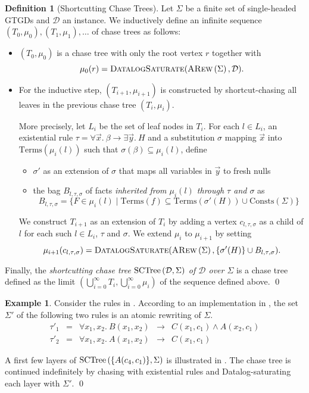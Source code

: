 \documentclass[12pt]{report}
\theoremstyle{plain}
\theoremstyle{definition}
\newtheorem{definition}[theorem]{Definition}
\newtheorem{example}[theorem]{Example}
\def\Consts{{\mathrm{Consts}}}
\def\Terms{{\mathrm{Terms}}}
\newcommand{\ARew}[1]{\ensuremath{\normalfont{\textsc{ARew}} \left( #1 \right)}}
\newcommand{\SCTree}[2]{\ensuremath{\normalfont{\textrm{SCTree}} \left( #1, #2 \right)}}
\begin{document}
\begin{definition}[Shortcutting Chase Trees]
  Let $\Sigma$ be a finite set of single-headed GTGDs and $\mathcal{D}$ an instance. We inductively define an infinite sequence $(T_0, \mu_0), (T_1, \mu_1), \ldots$ of chase trees as follows:
  \begin{itemize}
    \item $(T_0, \mu_0)$ is a chase tree with only the root vertex $r$ together with $$\mu_0(r) = \textsc{DatalogSaturate}(\ARew{\Sigma}, \mathcal{D}).$$
    \item For the inductive step, $(T_{i + 1}, \mu_{i + 1})$ is constructed by shortcut-chasing all leaves in the previous chase tree $(T_i, \mu_i)$.
    
    More precisely, let $L_i$ be the set of leaf nodes in $T_i$. For each $l \in L_i$, an existential rule $\tau = \forall \vec{x}.\ \beta \rightarrow \exists \vec{y}.\ H$ and a substitution $\sigma$ mapping $\vec{x}$ into $\Terms(\mu_i(l))$ such that $\sigma(\beta) \subseteq \mu_i(l)$, define
    \begin{itemize}
      \item $\sigma'$ as an extension of $\sigma$ that maps all variables in $\vec{y}$ to fresh nulls
      \item the bag $B_{l, \tau, \sigma}$ of facts \emph{inherited from $\mu_i(l)$ through $\tau$ and $\sigma$} as $$B_{l, \tau, \sigma} = \{ F \in \mu_i(l) \mid \Terms(f) \subseteq \Terms(\sigma'(H)) \cup \Consts(\Sigma) \}$$
    \end{itemize}
    We construct $T_{i+1}$ as an extension of $T_i$ by adding a vertex $c_{l, \tau, \sigma}$ as a child of $l$ for each such $l \in L_i$, $\tau$ and $\sigma$. We extend $\mu_i$ to $\mu_{i+1}$ by setting $$\mu_{i+1}(c_{l, \tau, \sigma}) = \textsc{DatalogSaturate}(\ARew{\Sigma}, \{ \sigma'(H) \} \cup B_{l, \tau, \sigma}).$$
  \end{itemize}
  Finally, the \emph{shortcutting chase tree $\SCTree{\mathcal{D}}{\Sigma}$ of $\mathcal{D}$ over $\Sigma$} is a chase tree defined as the limit $(\bigcup_{i = 0}^\infty T_i, \bigcup_{i = 0}^\infty \mu_i)$ of the sequence defined above.
  \qed
\end{definition}

\begin{example}
\label{sctree-simple-example}
  Consider the rules in . According to an implementation in \cite{Benedikt_Rewriting_the_Infinite}, the set $\Sigma'$ of the following two rules is an atomic rewriting of $\Sigma$.
  \[\begin{array}{ccrcl}
    \tau'_1 & = & \forall x_1, x_2.\ B(x_1, x_2) & \rightarrow & C(x_1, c_1) \wedge A(x_2, c_1) \\
    \tau'_2 & = & \forall x_1, x_2.\ A(x_1, x_2) & \rightarrow & C(x_1, c_1)
  \end{array}\]

  A first few layers of $\SCTree{\{ A(c_4, c_1) \}}{\Sigma}$ is illustrated in . The chase tree is continued indefinitely by chasing with existential rules and Datalog-saturating each layer with $\Sigma'$.
  \qed
\end{example}
\end{document}
